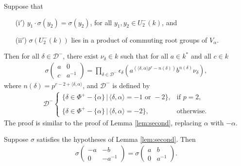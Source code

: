 \begin{remark} \label{rem:second}
	Suppose that
\begin{itemize}
\item[(i$'$)] $y_1 \cdot\sigma(y_2) = \sigma(y_2)$, for all $y_1, y_2 \in U^-_2(k)$, and
\item[(ii$'$)] $\sigma(U^-_2(k))$ lies in a product of commuting root groups of $V_\alpha$.
\end{itemize}
Then for all $\delta \in \mathcal{D}^-$, there exist $\nu_\delta \in k$ such that for all $a \in k^*$ and all $c \in k$
\begin{align*}
	\sigma\left(\begin{matrix}a & 0\\c & a^{-1}\end{matrix}\right) = \prod_{\delta\in\mathcal{D}^-}\epsilon_\delta\left(a^{(\langle\delta,\alpha\rangle p^r - n(\delta))}b^{n(\delta)}\nu_\delta\right),
\end{align*}
where $n(\delta) = p^{r-2+\langle\delta,\alpha\rangle}$, and $\mathcal{D}^-$ is defined by
\begin{align*}
\mathcal{D}^-\left\{\begin{array}{ll}
	\{\delta \in \Phi^+-\{\alpha\} \,|\, \langle\delta,\alpha\rangle = -1\textrm{ or }-2\},&\textrm{if }p = 2, \\ \\
	\{\delta \in \Phi^+-\{\alpha\} \,|\, \langle\delta,\alpha\rangle = -2\},&\textrm{otherwise}.
\end{array}\right.
\end{align*}
The proof is similar to the proof of Lemma \ref{lem:second}, replacing $\alpha$ with $-\alpha$.
\end{remark}

\begin{corollary}\label{sigmaneg}
Suppose $\sigma$ satisfies the hypotheses of Lemma \ref{lem:second}. Then
\begin{align*}
	\sigma\left(\begin{matrix}-a & -b\\0 & -a^{-1}\end{matrix}\right) = \sigma\left(\begin{matrix}a & b\\0 & a^{-1}\end{matrix}\right).
\end{align*}
\end{corollary}

